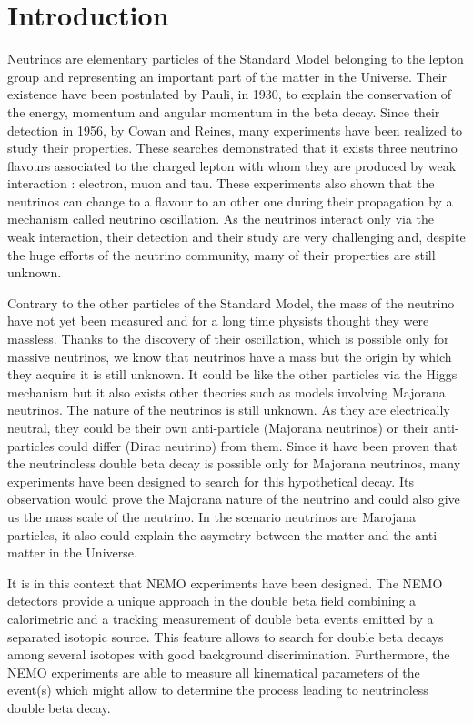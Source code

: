 \documentclass[main.tex]{subfiles}
\begin{document}
\chapter*{Introduction}


\NI Neutrinos are elementary particles of the Standard Model belonging to the lepton group and representing an important part of the matter in the Universe. Their existence have been postulated by Pauli, in 1930, to explain the conservation of the energy, momentum and angular momentum in the beta decay. Since their detection in 1956, by Cowan and Reines, many experiments have been realized to study their properties. These searches demonstrated that it exists three neutrino flavours associated to the charged lepton with whom they are produced by weak interaction : electron, muon and tau. These experiments also shown that the neutrinos can change to a flavour to an other one during their propagation by a mechanism called neutrino oscillation. As the neutrinos interact only via the weak interaction, their detection and their study are very challenging and, despite the huge efforts of the neutrino community, many of their properties are still unknown.


\bigskip


\NI Contrary to the other particles of the Standard Model, the mass of the neutrino have not yet been measured and for a long time physists thought they were massless. Thanks to the discovery of their oscillation, which is possible only for massive neutrinos, we know that neutrinos have a mass but the origin by which they acquire it is still unknown. It could be like the other particles via the Higgs mechanism but it also exists other theories such as models involving Majorana neutrinos. The nature of the neutrinos is still unknown. As they are electrically neutral, they could be their own anti-particle (Majorana neutrinos) or their anti-particles could differ (Dirac neutrino) from them. Since it have been proven that the neutrinoless double beta decay is possible only for Majorana neutrinos, many experiments have been designed to search for this hypothetical decay. Its observation would prove the Majorana nature of the neutrino and could also give us the mass scale of the neutrino. In the scenario neutrinos are Marojana particles, it also could explain the asymetry between the matter and the anti-matter in the Universe.


\bigskip


\NI It is in this context that NEMO experiments have been designed. The NEMO detectors provide a unique approach in the double beta field combining a calorimetric and a tracking measurement of double beta events emitted by a separated isotopic source. This feature allows to search for double beta decays among several isotopes with good background discrimination. Furthermore, the NEMO experiments are able to measure all kinematical parameters of the event(s) which might allow to determine the process leading to neutrinoless double beta decay.
\end{document}
